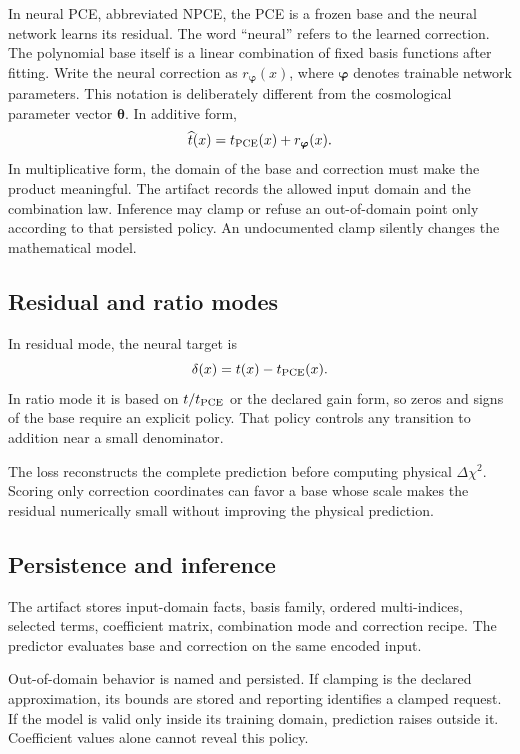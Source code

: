 \documentclass[10pt,aps,prd,twocolumn,nofootinbib]{revtex4-2}
\newcommand{\btheta}{\boldsymbol{\theta}}
\begin{document}
In neural PCE, abbreviated NPCE, the PCE is a frozen base and the neural
network learns its residual.  The word
``neural'' refers to the learned correction.  The polynomial base itself is a
linear combination of fixed basis functions after fitting.  Write the neural
correction as \(r_{\boldsymbol\varphi}(x)\), where
\(\boldsymbol\varphi\) denotes trainable network parameters.  This notation is
deliberately different from the cosmological parameter vector
\(\btheta\).  In additive form,
\begin{equation*}
  \widehat t(x)=t_{\rm PCE}(x)+r_{\boldsymbol\varphi}(x).
\end{equation*}
In multiplicative form, the domain of the base and correction must make the
product meaningful.  The artifact records the allowed input domain and the
combination law.  Inference may clamp or refuse an out-of-domain point only
according to that persisted policy.  An undocumented clamp silently changes
the mathematical model.

\subsection{Residual and ratio modes}

In residual mode, the neural target is
\begin{equation*}
 \delta(x)=t(x)-t_{\rm PCE}(x).
\end{equation*}
In ratio mode it is based on \(t/t_{\rm PCE}\) or the declared gain form, so
zeros and signs of the base require an explicit policy.  That policy controls
any transition to addition near a small denominator.

The loss reconstructs the complete prediction before computing physical
\(\Delta\chi^2\).  Scoring only correction coordinates can favor a base whose
scale makes the residual numerically small without improving the physical
prediction.

\subsection{Persistence and inference}

The artifact stores input-domain facts, basis family, ordered multi-indices,
selected terms, coefficient matrix, combination mode and correction recipe.
The predictor evaluates base and correction on the same encoded input.

Out-of-domain behavior is named and persisted.  If clamping is the declared
approximation, its bounds are stored and reporting identifies a clamped
request.  If the model is valid only inside its training domain, prediction
raises outside it.  Coefficient values alone cannot reveal this policy.
\end{document}
